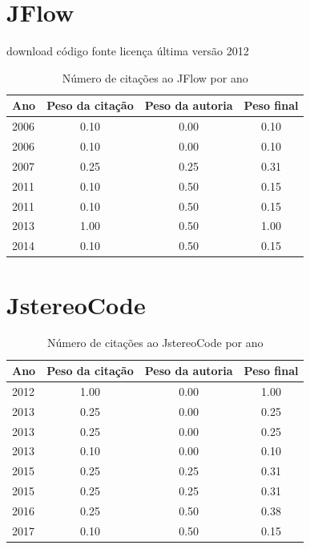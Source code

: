 \section{JFlow}
\checkmark download
\checkmark código fonte
\checkmark licença
\checkmark última versão 2012
\begin{table}[H]
\caption{Número de citações ao JFlow por ano}
\centering
\begin{tabular}{| l | c | c | c |}
  \hline
  Ano & Peso da citação & Peso da autoria & Peso final \\
  \hline
  2006
    & 0.10
    & 0.00
    & {\color{red} 0.10} \\
  2006
    & 0.10
    & 0.00
    & {\color{red} 0.10} \\
\hline
  2007
    & 0.25
    & 0.25
    & {\color{red} 0.31} \\
\hline
  2011
    & 0.10
    & 0.50
    & {\color{red} 0.15} \\
  2011
    & 0.10
    & 0.50
    & {\color{red} 0.15} \\
\hline
  2013
    & 1.00
    & 0.50
    & {\color{blue} 1.00} \\
\hline
  2014
    & 0.10
    & 0.50
    & {\color{red} 0.15} \\
\hline
\end{tabular}
\end{table}
\section{JstereoCode}
\begin{table}[H]
\caption{Número de citações ao JstereoCode por ano}
\centering
\begin{tabular}{| l | c | c | c |}
  \hline
  Ano & Peso da citação & Peso da autoria & Peso final \\
  \hline
  2012
    & 1.00
    & 0.00
    & {\color{blue} 1.00} \\
\hline
  2013
    & 0.25
    & 0.00
    & {\color{red} 0.25} \\
  2013
    & 0.25
    & 0.00
    & {\color{red} 0.25} \\
  2013
    & 0.10
    & 0.00
    & {\color{red} 0.10} \\
\hline
  2015
    & 0.25
    & 0.25
    & {\color{red} 0.31} \\
  2015
    & 0.25
    & 0.25
    & {\color{red} 0.31} \\
\hline
  2016
    & 0.25
    & 0.50
    & {\color{red} 0.38} \\
\hline
  2017
    & 0.10
    & 0.50
    & {\color{red} 0.15} \\
\hline
\end{tabular}
\end{table}
